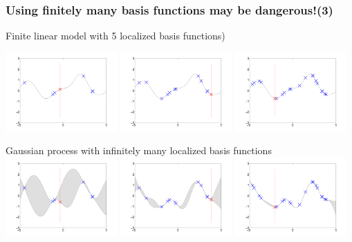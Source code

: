 \begin{frame}
\frametitle{\!\!\!Using finitely many basis functions may be dangerous!(3)}

Finite linear model with 5 localized basis functions)

\includegraphics[width=0.32\textwidth]{seq_linear_M7.pdf}
\includegraphics[width=0.32\textwidth]{seq_linear_M12.pdf}
\includegraphics[width=0.32\textwidth]{seq_linear_M20.pdf}

Gaussian process with infinitely many localized basis functions
\includegraphics[width=0.32\textwidth]{seq_fullGP_M7.pdf}
\includegraphics[width=0.32\textwidth]{seq_fullGP_M12.pdf}
\includegraphics[width=0.32\textwidth]{seq_fullGP_M20.pdf}
\end{frame}


